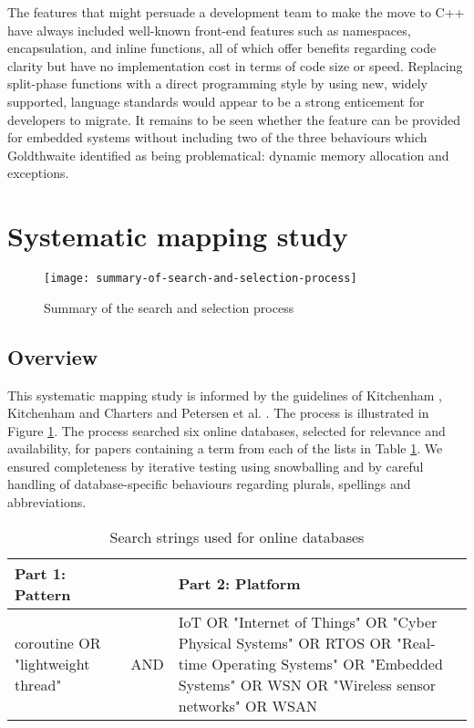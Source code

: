 The features that might persuade a development team to make the move to C++ have always included well-known front-end features such as namespaces, encapsulation, and inline functions, all of which offer benefits regarding code clarity but have no implementation cost in terms of code size or speed. Replacing split-phase functions with a direct programming style by using new, widely supported, language standards would appear to be a strong enticement for developers to migrate. It remains to be seen whether the feature can be provided for embedded systems without including two of the three behaviours which Goldthwaite \cite{Goldthwaite2006} identified as being problematical: dynamic memory allocation and exceptions.

\section{Systematic mapping study}
\label{section:sms}

\begin{figure}[h]
	\texttt{[image: summary-of-search-and-selection-process]}
	\caption{Summary of the search and selection process}
	\label{fig:sms}
\end{figure}

\subsection{Overview}

This systematic mapping study is informed by the guidelines of Kitchenham \cite{Kitchenham2004}, Kitchenham and Charters \cite{Kitchenham2007} and Petersen et al. \cite{Petersen2008}. The process is illustrated in Figure \ref{fig:sms}. The process searched six online databases, selected for relevance \cite{Brereton2007} and availability, for papers containing a term from each of the lists in Table \ref{table-databases}. We ensured completeness by iterative testing using snowballing \cite{Kitchenham2011a, Petersen2015} and by careful handling of database-specific behaviours regarding plurals, spellings and abbreviations.

\begin{table}[h]%
	\caption{Search strings used for online databases}
	\label{table-databases}
	\begin{tabular}{ p{4.5cm} c p{7cm} }
		\hline
		Part 1: Pattern & & Part 2: Platform\\
		\hline
		coroutine OR "lightweight thread" & AND & IoT OR "Internet of Things" OR "Cyber Physical Systems" OR RTOS OR "Real-time Operating Systems" OR "Embedded Systems" OR WSN OR "Wireless sensor networks" OR WSAN\\
		\hline
	\end{tabular}
\end{table}

